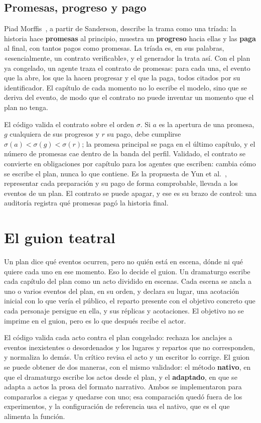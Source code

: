 \subsection{Promesas, progreso y pago}\label{sec:promesas}

Piad Morffis~\cite{piad2026}, a partir de Sanderson, describe la trama como una tríada: la historia
hace \textbf{promesas} al principio, muestra un \textbf{progreso} hacia ellas y las \textbf{paga}
al final, con tantos pagos como promesas. La tríada es, en sus palabras, «esencialmente, un contrato
verificable», y el generador la trata así. Con el plan ya congelado, un agente traza el contrato de
promesas: para cada una, el evento que la abre, los que la hacen progresar y el que la paga, todos
citados por su identificador. El capítulo de cada momento no lo escribe el modelo, sino que se
deriva del evento, de modo que el contrato no puede inventar un momento que el plan no tenga.

El código valida el contrato sobre el orden $\sigma$. Si $a$ es la apertura de una promesa, $g$
cualquiera de sus progresos y $r$ su pago, debe cumplirse $\sigma(a) < \sigma(g) < \sigma(r)$; la
promesa principal se paga en el último capítulo, y el número de promesas cae dentro de la banda del
perfil. Validado, el contrato se convierte en obligaciones por capítulo para los agentes que
escriben: cambia cómo se escribe el plan, nunca lo que contiene. Es la propuesta de Yun et
al.~\cite{yun2026}, representar cada preparación y su pago de forma comprobable, llevada a los
eventos de un plan. El contrato se puede apagar, y ese es su brazo de control: una auditoría
registra qué promesas pagó la historia final.

\section{El guion teatral}\label{sec:guion}

Un plan dice qué eventos ocurren, pero no quién está en escena, dónde ni qué quiere cada uno en ese
momento. Eso lo decide el guion. Un dramaturgo escribe cada capítulo del plan como un acto dividido
en escenas. Cada escena se ancla a uno o varios eventos del plan, en su orden, y declara su lugar,
una acotación inicial con lo que vería el público, el reparto presente con el objetivo concreto que
cada personaje persigue en ella, y sus réplicas y acotaciones. El objetivo no se imprime en el guion,
pero es lo que después recibe el actor.

El código valida cada acto contra el plan congelado: rechaza los anclajes a eventos inexistentes o
desordenados y los lugares y repartos que no corresponden, y normaliza lo demás. Un crítico revisa el
acto y un escritor lo corrige. El guion se puede obtener de dos maneras, con el mismo validador: el
método \textbf{nativo}, en que el dramaturgo escribe los actos desde el plan, y el \textbf{adaptado},
en que se adapta a actos la prosa del formato narrativo. Ambos se implementaron para compararlos a
ciegas y quedarse con uno; esa comparación quedó fuera de los experimentos, y la configuración
de referencia usa el nativo, que es el que alimenta la función.

